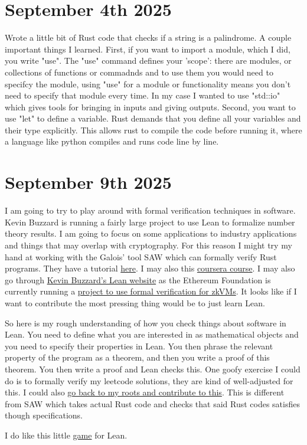\documentclass{amsart}
\theoremstyle{definition}
\begin{document}
\section{September 4th 2025}
Wrote a little bit of Rust code that checks if a string is a palindrome. A couple important things I learned. First, if you want to import a module, which I did, you write "use". The "use" command defines your 'scope': there are modules, or collections of functions or commadnds and to use them you would need to specifcy the module, using "use" for a module or functionality means you don't need to specify that module every time. In my case I wanted to use "std::io" which gives tools for bringing in inputs and giving outputs. Second, you want to use "let" to define a variable. Rust demands that you define all your variables and their type explicitly. This allows rust to compile the code before running it, where a language like python compiles and runs code line by line.


\section{September 9th 2025}

I am going to try to play around with formal verification techniques in software. Kevin Buzzard is running a fairly large project to use Lean to formalize number theory results. I am going to focus on some applications to industry applications and things that may overlap with cryptography. For this reason I might try my hand at working with the Galois' tool SAW which can formally verify Rust programs. They have a tutorial \href{https://galoisinc.github.io/saw-script/master/rust-verification-with-saw/index.html}{here}. I may also this \href{https://www.coursera.org/learn/introduction-to-modeling-for-formal-verification}{coursera course}. I may also go through \href{https://leanprover-community.github.io/}{Kevin Buzzard's Lean website} as the Ethereum Foundation is currently running a \href{https://verified-zkevm.org/}{project to use formal verification for zkVMs}. It looks like if I want to contribute the most pressing thing would be to just learn Lean.

So here is my rough understanding of how you check things about software in Lean. You need to define what you are interested in as mathematical objects and you need to specify their properties in Lean. You then phrase the relevant property of the program as a theorem, and then you write a proof of this theorem. You then write a proof and Lean checks this. One goofy exercise I could do is to formally verify my leetcode solutions, they are kind of well-adjusted for this. I could also \href{https://yaeldillies.github.io/Toric/?utm_source=chatgpt.com}{go back to my roots and contribute to this}. This is different from SAW which takes actual Rust code and checks that said Rust codes satisfies though specifications. 

I do like this little \href{https://www.ma.imperial.ac.uk/~buzzard/xena/natural_number_game/index2.html}{game} for Lean.



\nocite{*}

{}
\end{document}
